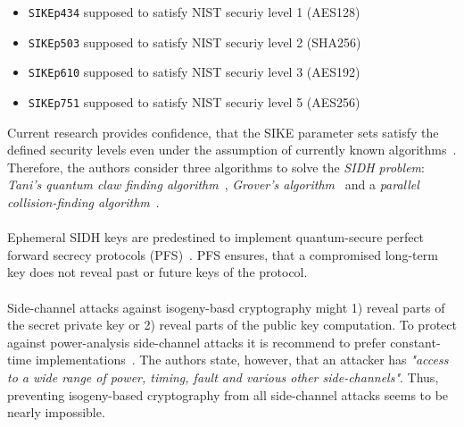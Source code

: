 \begin{itemize}
	\item \texttt{SIKEp434} supposed to satisfy NIST securiy level 1 (AES128)
	\item \texttt{SIKEp503} supposed to satisfy NIST securiy level 2 (SHA256)
	\item \texttt{SIKEp610} supposed to satisfy NIST securiy level 3 (AES192)
	\item \texttt{SIKEp751} supposed to satisfy NIST securiy level 5 (AES256)
\end{itemize}
Current research provides confidence, that the SIKE parameter sets satisfy the defined security levels even under the assumption of currently known algorithms~\parencite{jaques2019quantum}. Therefore, the authors consider three algorithms to solve the \textit{SIDH problem}: \textit{Tani's quantum claw finding algorithm}~\parencite{tani2009claw}, \textit{Grover's algorithm}~\parencite{grover1996fast} and a \textit{parallel collision-finding algorithm}~\parencite{van1999parallel}.
\\\\
Ephemeral SIDH keys are predestined to implement quantum-secure perfect forward secrecy protocols (PFS)~\parencite{longa2018note}. PFS ensures, that a compromised long-term key does not reveal past or future keys of the protocol.
\\\\
Side-channel attacks against isogeny-basd cryptography might 1) reveal parts of the secret private key or 2) reveal parts of the public key computation. To protect against power-analysis side-channel attacks it is recommend to prefer constant-time implementations~\parencite{sike2020spec}. The authors state, however, that an attacker has \textit{"access to a wide range of power, timing, fault and various other side-channels"}. Thus, preventing isogeny-based cryptography from all side-channel attacks seems to be nearly impossible.
